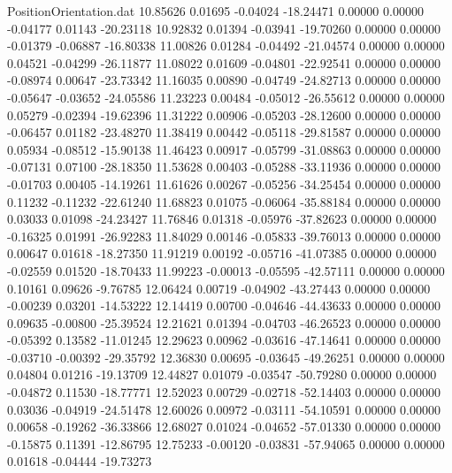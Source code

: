 \begin{filecontents}{PositionOrientation.dat}
  10.85626    0.01695   -0.04024   -18.24471    0.00000    0.00000   -0.04177    0.01143  -20.23118
  10.92832    0.01394   -0.03941   -19.70260    0.00000    0.00000   -0.01379   -0.06887  -16.80338
  11.00826    0.01284   -0.04492   -21.04574    0.00000    0.00000    0.04521   -0.04299  -26.11877
  11.08022    0.01609   -0.04801   -22.92541    0.00000    0.00000   -0.08974    0.00647  -23.73342
  11.16035    0.00890   -0.04749   -24.82713    0.00000    0.00000   -0.05647   -0.03652  -24.05586
  11.23223    0.00484   -0.05012   -26.55612    0.00000    0.00000    0.05279   -0.02394  -19.62396
  11.31222    0.00906   -0.05203   -28.12600    0.00000    0.00000   -0.06457    0.01182  -23.48270
  11.38419    0.00442   -0.05118   -29.81587    0.00000    0.00000    0.05934   -0.08512  -15.90138
  11.46423    0.00917   -0.05799   -31.08863    0.00000    0.00000   -0.07131    0.07100  -28.18350
  11.53628    0.00403   -0.05288   -33.11936    0.00000    0.00000   -0.01703    0.00405  -14.19261
  11.61626    0.00267   -0.05256   -34.25454    0.00000    0.00000    0.11232   -0.11232  -22.61240
  11.68823    0.01075   -0.06064   -35.88184    0.00000    0.00000    0.03033    0.01098  -24.23427
  11.76846    0.01318   -0.05976   -37.82623    0.00000    0.00000   -0.16325    0.01991  -26.92283
  11.84029    0.00146   -0.05833   -39.76013    0.00000    0.00000    0.00647    0.01618  -18.27350
  11.91219    0.00192   -0.05716   -41.07385    0.00000    0.00000   -0.02559    0.01520  -18.70433
  11.99223   -0.00013   -0.05595   -42.57111    0.00000    0.00000    0.10161    0.09626   -9.76785
  12.06424    0.00719   -0.04902   -43.27443    0.00000    0.00000   -0.00239    0.03201  -14.53222
  12.14419    0.00700   -0.04646   -44.43633    0.00000    0.00000    0.09635   -0.00800  -25.39524
  12.21621    0.01394   -0.04703   -46.26523    0.00000    0.00000   -0.05392    0.13582  -11.01245
  12.29623    0.00962   -0.03616   -47.14641    0.00000    0.00000   -0.03710   -0.00392  -29.35792
  12.36830    0.00695   -0.03645   -49.26251    0.00000    0.00000    0.04804    0.01216  -19.13709
  12.44827    0.01079   -0.03547   -50.79280    0.00000    0.00000   -0.04872    0.11530  -18.77771
  12.52023    0.00729   -0.02718   -52.14403    0.00000    0.00000    0.03036   -0.04919  -24.51478
  12.60026    0.00972   -0.03111   -54.10591    0.00000    0.00000    0.00658   -0.19262  -36.33866
  12.68027    0.01024   -0.04652   -57.01330    0.00000    0.00000   -0.15875    0.11391  -12.86795
  12.75233   -0.00120   -0.03831   -57.94065    0.00000    0.00000    0.01618   -0.04444  -19.73273

\end{filecontents}
